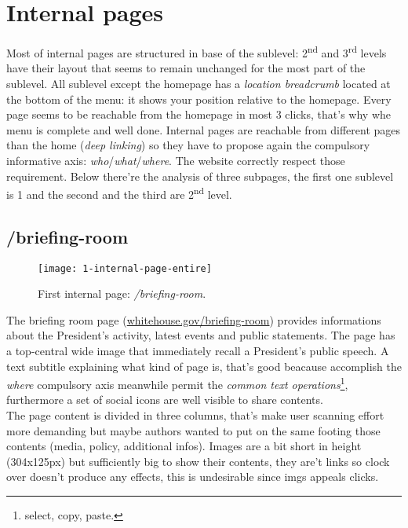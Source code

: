 \documentclass[
12pt, %
a4paper, %
oneside, %
headinclude,footinclude, %
BCOR5mm, %
]{scrartcl}
\begin{document}

\section{Internal pages}
Most of internal pages are structured in base of the sublevel: 2\textsuperscript{nd} and 3\textsuperscript{rd} levels have their layout that seems to remain unchanged for the most part of the sublevel.
All sublevel except the homepage has a \emph{location breadcrumb} located at the bottom of the menu: it shows your position relative to the homepage.
Every page seems to be reachable from the homepage in most 3 clicks, that's why whe menu is complete and well done. 
Internal pages are reachable from different pages than the home (\emph{deep linking}) so they have to propose again the compulsory informative axis: \emph{who}/\emph{what}/\emph{where}. The website correctly respect those requirement.
Below there're the analysis of three subpages, the first one sublevel is 1 and the second and the third are 2\textsuperscript{nd} level.

	\subsection{/briefing-room}
	

	\begin{figure}[h]
	\centering 
	\centerline{\texttt{[image: 1-internal-page-entire]}}
	\caption[First internal page: /briefing-room]{First internal page: \emph{/briefing-room}.}
	\label{fig:primapaginainterna} 
	\end{figure}

	The briefing room page (\href{http://www.whitehouse.gov/briefing-room}{whitehouse.gov/briefing-room}) provides informations about the President's activity, latest events and public statements. The page has a top-central wide image that immediately recall a President's public speech. A text subtitle explaining what kind of page is, that's good beacause accomplish the \emph{where} compulsory axis meanwhile permit the \emph{common text operations}\footnote{select, copy, paste.}, furthermore a set of social icons are well visible to share contents. \\
	The page content is divided in three columns, that's make user scanning effort more demanding but maybe authors wanted to put on the same footing those contents (media, policy, additional infos). Images are a bit short in height (304x125px) but sufficiently big to show their contents, they are't links so clock over doesn't produce any effects, this is undesirable since imgs appeals clicks.
\end{document}
